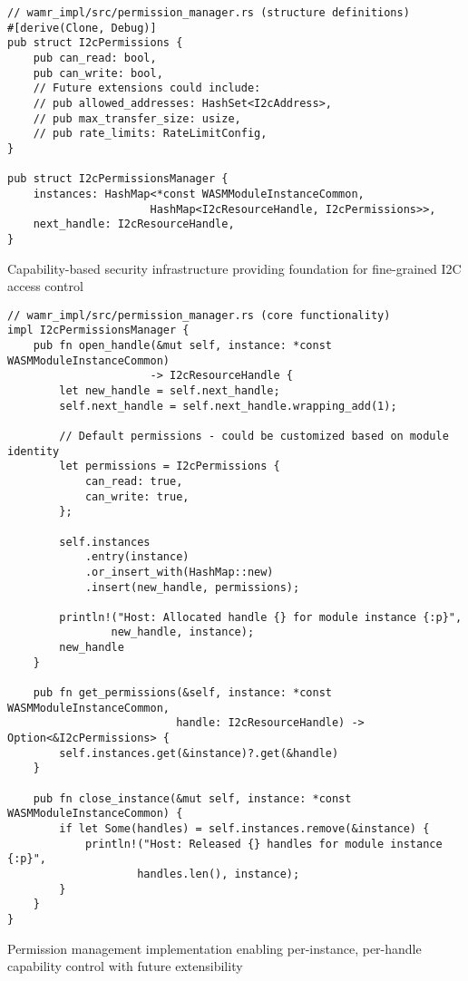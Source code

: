 \begin{listing}[H]
\begin{verbatim}
// wamr_impl/src/permission_manager.rs (structure definitions)
#[derive(Clone, Debug)]
pub struct I2cPermissions {
    pub can_read: bool,
    pub can_write: bool,
    // Future extensions could include:
    // pub allowed_addresses: HashSet<I2cAddress>,
    // pub max_transfer_size: usize,
    // pub rate_limits: RateLimitConfig,
}

pub struct I2cPermissionsManager {
    instances: HashMap<*const WASMModuleInstanceCommon, 
                      HashMap<I2cResourceHandle, I2cPermissions>>,
    next_handle: I2cResourceHandle,
}
\end{verbatim}
\caption{Capability-based security infrastructure providing foundation for fine-grained I2C access control}
\label{lst:permission-structures}
\end{listing}

\begin{listing}[H]
\begin{verbatim}
// wamr_impl/src/permission_manager.rs (core functionality)
impl I2cPermissionsManager {
    pub fn open_handle(&mut self, instance: *const WASMModuleInstanceCommon) 
                      -> I2cResourceHandle {
        let new_handle = self.next_handle;
        self.next_handle = self.next_handle.wrapping_add(1);
        
        // Default permissions - could be customized based on module identity
        let permissions = I2cPermissions {
            can_read: true,
            can_write: true,
        };
        
        self.instances
            .entry(instance)
            .or_insert_with(HashMap::new)
            .insert(new_handle, permissions);
            
        println!("Host: Allocated handle {} for module instance {:p}", 
                new_handle, instance);
        new_handle
    }

    pub fn get_permissions(&self, instance: *const WASMModuleInstanceCommon, 
                          handle: I2cResourceHandle) -> Option<&I2cPermissions> {
        self.instances.get(&instance)?.get(&handle)
    }

    pub fn close_instance(&mut self, instance: *const WASMModuleInstanceCommon) {
        if let Some(handles) = self.instances.remove(&instance) {
            println!("Host: Released {} handles for module instance {:p}", 
                    handles.len(), instance);
        }
    }
}
\end{verbatim}
\caption{Permission management implementation enabling per-instance, per-handle capability control with future extensibility}
\label{lst:permission-implementation}
\end{listing}

